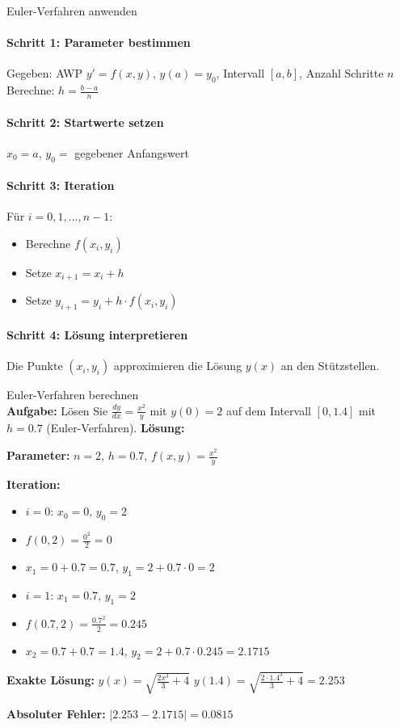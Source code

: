 \begin{KR}{Euler-Verfahren anwenden}
\paragraph{Schritt 1: Parameter bestimmen}
Gegeben: AWP $y' = f(x,y)$, $y(a) = y_0$, Intervall $[a,b]$, Anzahl Schritte $n$
Berechne: $h = \frac{b-a}{n}$

\paragraph{Schritt 2: Startwerte setzen}
$x_0 = a$, $y_0 = $ gegebener Anfangswert

\paragraph{Schritt 3: Iteration}
Für $i = 0, 1, ..., n-1$:
\begin{itemize}
    \item Berechne $f(x_i, y_i)$
    \item Setze $x_{i+1} = x_i + h$
    \item Setze $y_{i+1} = y_i + h \cdot f(x_i, y_i)$
\end{itemize}

\paragraph{Schritt 4: Lösung interpretieren}
Die Punkte $(x_i, y_i)$ approximieren die Lösung $y(x)$ an den Stützstellen.
\end{KR}

\begin{example2}{Euler-Verfahren berechnen}\\
\textbf{Aufgabe:} Lösen Sie $\frac{dy}{dx} = \frac{x^2}{y}$ mit $y(0) = 2$ auf dem Intervall $[0, 1.4]$ mit $h = 0.7$ (Euler-Verfahren).
\tcblower
\textbf{Lösung:}

\textbf{Parameter:} $n = 2$, $h = 0.7$, $f(x,y) = \frac{x^2}{y}$

\textbf{Iteration:}
\begin{itemize}
    \item $i = 0$: $x_0 = 0$, $y_0 = 2$
    \item $f(0, 2) = \frac{0^2}{2} = 0$
    \item $x_1 = 0 + 0.7 = 0.7$, $y_1 = 2 + 0.7 \cdot 0 = 2$
\end{itemize}

\begin{itemize}
    \item $i = 1$: $x_1 = 0.7$, $y_1 = 2$
    \item $f(0.7, 2) = \frac{0.7^2}{2} = 0.245$
    \item $x_2 = 0.7 + 0.7 = 1.4$, $y_2 = 2 + 0.7 \cdot 0.245 = 2.1715$
\end{itemize}

\textbf{Exakte Lösung:} $y(x) = \sqrt{\frac{2x^3}{3} + 4}$
$y(1.4) = \sqrt{\frac{2 \cdot 1.4^3}{3} + 4} = 2.253$

\textbf{Absoluter Fehler:} $|2.253 - 2.1715| = 0.0815$
\end{example2}

